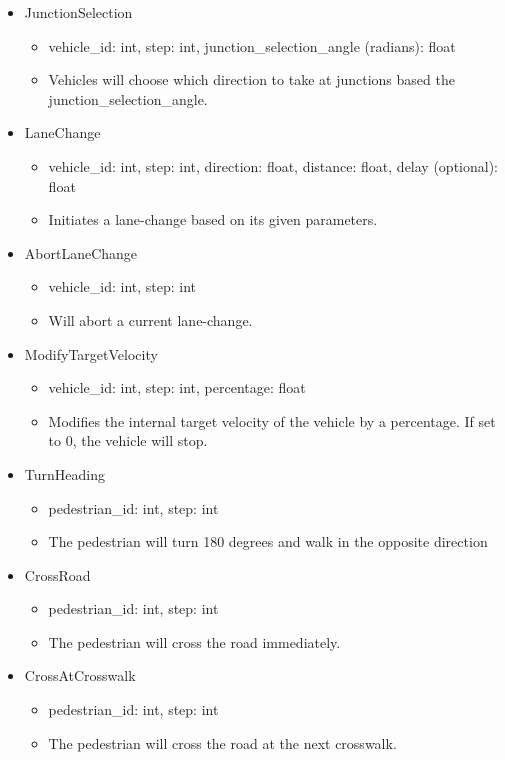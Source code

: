 \begin{itemize}
	\item JunctionSelection
	\begin{itemize}
		\item vehicle\_id: int, step: int, junction\_selection\_angle (radians): float
		\item Vehicles will choose which direction to take at junctions based the junction\_selection\_angle.
	\end{itemize}
	\item LaneChange
	\begin{itemize}
		\item vehicle\_id: int, step: int, direction: float, distance: float, delay (optional): float
		\item Initiates a lane-change based on its given parameters.
	\end{itemize}
	\item AbortLaneChange
	\begin{itemize}
		\item vehicle\_id: int, step: int
		\item Will abort a current lane-change.
	\end{itemize}
	\item ModifyTargetVelocity
	\begin{itemize}
		\item vehicle\_id: int, step: int, percentage: float
		\item Modifies the internal target velocity of the vehicle by a percentage. If set to 0, the vehicle will stop.
	\end{itemize}
	\item TurnHeading
	\begin{itemize}
		\item pedestrian\_id: int, step: int
		\item The pedestrian will turn 180 degrees and walk in the opposite direction
	\end{itemize}
	\item CrossRoad
	\begin{itemize}
		\item pedestrian\_id: int, step: int
		\item The pedestrian will cross the road immediately.
	\end{itemize}
	\item CrossAtCrosswalk
	\begin{itemize}
		\item pedestrian\_id: int, step: int
		\item The pedestrian will cross the road at the next crosswalk.
	\end{itemize}
\end{itemize}

